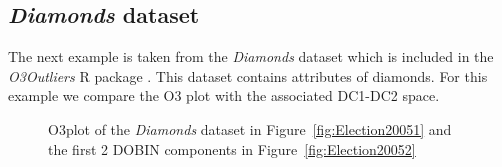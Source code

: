 \documentclass[11pt]{article}
\begin{document}
\subsection{\textit{Diamonds} dataset}\label{sec:ResWithVis2}
The next example is taken from the \textit{Diamonds} dataset \citep{ggplot2} which is included in the \textit{O3Outliers} R package \citep{O3Rpack}. This dataset contains attributes of diamonds. For this example we compare the O3 plot with the associated DC1-DC2 space.  \\ 

\begin{figure}[!t]
	\centering
	\caption{O3plot of the \textit{Diamonds} dataset in Figure~\ref{fig:Election20051} and the first 2 DOBIN components in Figure~\ref{fig:Election20052} }
	\label{fig:Diamonds}
\end{figure}
\end{document}
